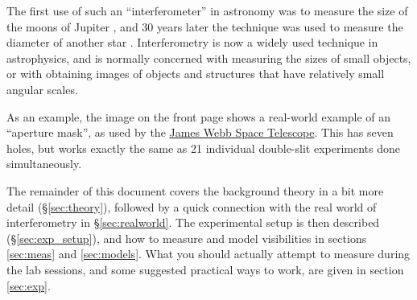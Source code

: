 \documentclass[11pt]{article}
\begin{document}
The first use of such an ``interferometer'' in astronomy was to measure the size of the moons of Jupiter \citep{1891PASP....3..274M,1891Natur..45..160M}, and 30 years later the technique was used to measure the diameter of another star \citep{1921ApJ....53..249M}. Interferometry is now a widely used technique in astrophysics, and is normally concerned with measuring the sizes of small objects, or with obtaining images of objects and structures that have relatively small angular scales.



As an example, the image on the front page shows a real-world example of an ``aperture mask'', as used by the \href{https://jwst-docs.stsci.edu/jwst-near-infrared-imager-and-slitless-spectrograph/niriss-observing-modes/niriss-aperture-masking-interferometry}{James Webb Space Telescope}. This has seven holes, but works exactly the same as 21 individual double-slit experiments done simultaneously.

The remainder of this document covers the background theory in a bit more detail (\S \ref{sec:theory}), followed by a quick connection with the real world of interferometry in \S \ref{sec:realworld}. The experimental setup is then described (\S \ref{sec:exp_setup}), and how to measure and model visibilities in sections \ref{sec:meas} and \ref{sec:models}. What you should actually attempt to measure during the lab sessions, and some suggested practical ways to work, are given in section \ref{sec:exp}.
\end{document}
